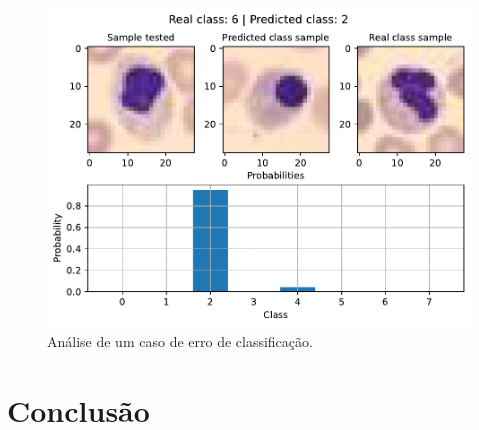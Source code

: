 \begin{figure}[H]
\centering
\includegraphics[width=0.75\linewidth]{../../plot/cnn_deep/error_analyser_62}
\caption{Análise de um caso de erro de classificação.}
\label{fig:error_analyser_62_cnn_deep}
\end{figure}

\clearpage
\section{Conclusão}

